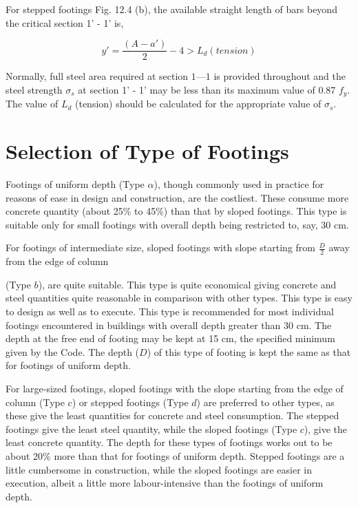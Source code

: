 For stepped footings Fig. 12.4 (b), the available straight length of bars beyond the critical
section 1’ - 1’ is,
                                                          
\begin{equation}                                                        
        y'= \frac{(A-a')}{2}-4 >L_d (tension)                                      
\end{equation}

Normally, full steel area required at section $1 — 1$ is provided throughout and the steel strength $\sigma_s$ at section 1’ - 1’ may be less than its maximum value of 0.87 $f_y$. The value of $L_d$ (tension) should be calculated for the appropriate value of $\sigma_s$.

\section{Selection of Type of Footings}
Footings of uniform depth (Type $\alpha$), though commonly used in practice for reasons of ease in design and construction, are the costliest. These consume more concrete quantity (about 25\% to 45\%) than that by sloped footings. This type is suitable only for small footings with overall depth being restricted to, say, 30 cm.

For footings of intermediate size, sloped footings with slope starting from $\frac{D}{2}$ away from the edge of column

(Type $b$), are quite suitable. This type is quite economical giving concrete and steel quantities quite reasonable in comparison with other types. This type is easy to design as well as to execute. This type is recommended for most individual footings encountered in buildings with overall depth greater than 30 cm. The depth at the free end of footing may be kept at 15 cm, the specified minimum given by the Code. The depth ($D$) of this type of footing is kept the same as that for footings of uniform depth.

For large-sized footings, sloped footings with the slope starting from the edge of column
(Type $c$) or stepped footings (Type $d$) are preferred to other types, as these give the least quantities for concrete and steel consumption. The stepped footings give the least steel quantity, while the sloped footings (Type $c$), give the least concrete quantity. The depth for these types of footings works out to be about 20\% more than that for footings of uniform depth. Stepped footings are a little cumbersome in construction, while the sloped footings are easier in execution, albeit a little more labour-intensive than the footings of uniform depth.

